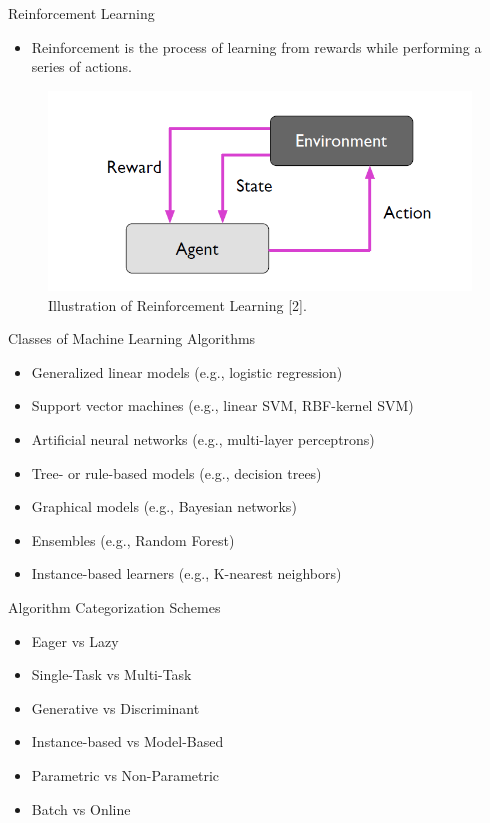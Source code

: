 \documentclass[compress,oilve]{beamer}
\begin{document}
\begin{frame}{Reinforcement Learning}
\begin{itemize}
\item Reinforcement is the process of learning from rewards while performing a series of actions.
\end{itemize}
\begin{figure}
 \centering
 \includegraphics[scale=0.75]{15}  
 \caption{Illustration of Reinforcement Learning [2].}
\end{figure}
\end{frame}

\begin{frame}{Classes of Machine Learning Algorithms}
\begin{itemize}
\item Generalized linear models (e.g., logistic regression)
\item Support vector machines (e.g., linear SVM, RBF-kernel SVM)
\item Artificial neural networks (e.g., multi-layer perceptrons)
\item Tree- or rule-based models (e.g., decision trees)
\item Graphical models (e.g., Bayesian networks)
\item Ensembles (e.g., Random Forest)
\item Instance-based learners (e.g., K-nearest neighbors)
\end{itemize}
\end{frame}


\begin{frame}{Algorithm Categorization Schemes}
\begin{itemize}
\item Eager vs Lazy
\item Single-Task vs Multi-Task
\item Generative vs Discriminant
\item Instance-based vs Model-Based
\item Parametric vs Non-Parametric
\item Batch vs Online
\end{itemize}
\end{frame}
\end{document}
